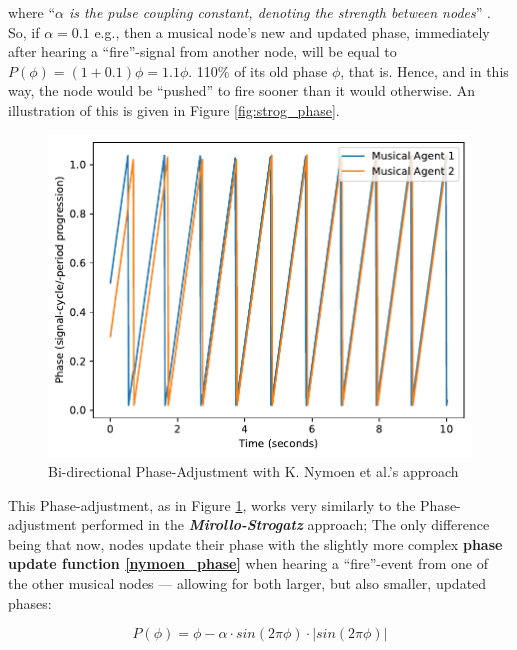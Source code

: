 			where ``\textit{$\alpha$ is the pulse coupling constant, denoting the strength between nodes}'' \cite{nymoen_synch}. So, if $\alpha = 0.1$ e.g., then a musical node's new and updated phase, immediately after hearing a ``fire''-signal from another node, will be equal to $P(\phi) = (1 + 0.1)\phi = 1.1\phi$. 110\% of its old phase $\phi$, that is. Hence, and in this way, the node would be ``pushed'' to fire sooner than it would otherwise. An illustration of this is given in Figure \ref{fig:strog_phase}.
			
			
			
			\begin{figure}[h]
				\centering
				\includegraphics[width=0.9\linewidth]{Assets/Figures/NymoenPhaseAdjustment.pdf}
				\caption{Bi-directional Phase-Adjustment with K. Nymoen et al.'s approach}
				\label{fig:nymoen_phase}
			\end{figure}
			
			This Phase-adjustment, as in Figure \ref{fig:nymoen_phase}, works very similarly to the Phase-adjustment performed in the \textbf{\textit{Mirollo-Strogatz}} approach; The only difference being that now, nodes update their phase with the slightly more complex \textbf{phase update function \eqref{nymoen_phase}} when hearing a ``fire''-event from one of the other musical nodes — allowing for both larger, but also smaller, updated phases:
			
			\begin{equation}
			\label{nymoen_phase}
				P(\phi) = \phi - \alpha \cdot sin(2\pi\phi) \cdot | sin(2\pi\phi) |
			\end{equation}
			
